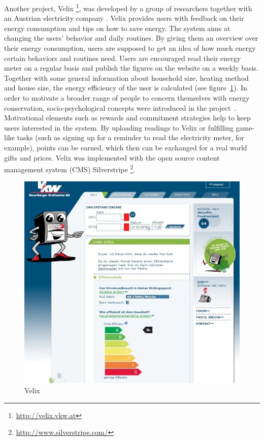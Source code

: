 Another project, Velix \footnote{\url{http://velix.vkw.at}}, was developed by a group of researchers together with an Austrian electricity company \cite{energy_efficiency_online}. Velix provides users with feedback on their energy consumption and tips on how to save energy. The system aims at changing the users' behavior and daily routines. By giving them an overview over their energy consumption, users are supposed to get an idea of how much energy certain behaviors and routines need.  
Users are encouraged read their energy meter on a regular basis and publish the figures on the website on a weekly basis. Together with some general information about household size, heating method and house size, the energy efficiency of the user is calculated (see figure~\ref{velix}). 
In order to motivate a broader range of people to concern themselves with energy conservation, socio-psychological concepts were introduced in the project~\cite{improving_residential_energy_consumption}. Motivational elements such as rewards and commitment strategies help to keep users interested in the system. By uploading readings to Velix or fulfilling game-like tasks (such as signing up for a reminder to read the electricity meter, for example), points can be earned, which then can be exchanged for a real world gifts and prices.  
Velix was implemented with the open source content management system (CMS) Silverstripe \footnote{\url{http://www.silverstripe.com/}}.
  
\begin{figure}[htbp]
\begin{center}
\includegraphics[width=12cm]{Images/velix.jpg}
\caption{Velix}
\label{velix}
\end{center}
\end{figure}  

